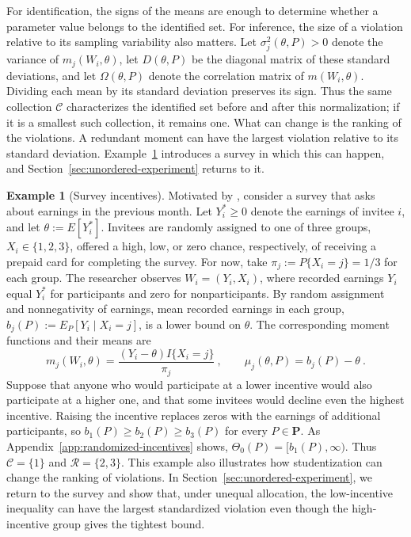 \documentclass[11pt]{article}
\numberwithin{equation}{section}
\theoremstyle{definition}
\newtheorem{example}{Example}
\begin{document}
For identification, the signs of the means are enough to determine whether a parameter value belongs to the identified set. For inference, the size of a violation relative to its sampling variability also matters. Let $\sigma_j^2(\theta,P)>0$ denote the variance of $m_j(W_i,\theta)$, let $D(\theta,P)$ be the diagonal matrix of these standard deviations, and let $\Omega(\theta,P)$ denote the correlation matrix of $m(W_i,\theta)$. Dividing each mean by its standard deviation preserves its sign. Thus the same collection $\mathcal C$ characterizes the identified set before and after this normalization; if it is a smallest such collection, it remains one. What can change is the ranking of the violations. A redundant moment can have the largest violation relative to its standard deviation. Example~\ref{ex:redundancy-precision} introduces a survey in which this can happen, and Section~\ref{sec:unordered-experiment} returns to it.

\begin{example}[Survey incentives]\label{ex:redundancy-precision}
Motivated by \citet{dutz/etal:26}, consider a survey that asks about earnings in the previous month. Let $Y_i^*\ge0$ denote the earnings of invitee $i$, and let $\theta:=E[Y_i^*]$. Invitees are randomly assigned to one of three groups, $X_i\in\{1,2,3\}$, offered a high, low, or zero chance, respectively, of receiving a prepaid card for completing the survey. For now, take $\pi_j:=P\{X_i=j\}=1/3$ for each group. The researcher observes $W_i=(Y_i,X_i)$, where recorded earnings $Y_i$ equal $Y_i^*$ for participants and zero for nonparticipants. By random assignment and nonnegativity of earnings, mean recorded earnings in each group, $b_j(P):=E_P[Y_i\mid X_i=j]$, is a lower bound on $\theta$. The corresponding moment functions and their means are
\[
m_j(W_i,\theta)=\frac{(Y_i-\theta)I\{X_i=j\}}{\pi_j}~,\qquad
\mu_j(\theta,P)=b_j(P)-\theta~.
\]
Suppose that anyone who would participate at a lower incentive would also participate at a higher one, and that some invitees would decline even the highest incentive. Raising the incentive replaces zeros with the earnings of additional participants, so $b_1(P)\ge b_2(P)\ge b_3(P)$ for every $P\in\mathbf P$. As Appendix~\ref{app:randomized-incentives} shows, $\Theta_0(P)=[b_1(P),\infty)$. Thus $\mathcal C=\{1\}$ and $\mathcal R=\{2,3\}$. This example also illustrates how studentization can change the ranking of violations. In Section~\ref{sec:unordered-experiment}, we return to the survey and show that, under unequal allocation, the low-incentive inequality can have the largest standardized violation even though the high-incentive group gives the tightest bound.
\end{example}
\end{document}
